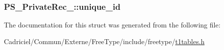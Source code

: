 \hypertarget{struct_p_s___private_rec___ae862c1db170cfee85aa3242be9fa5d57}{
\subsubsection[{unique\-\_\-id}]{ P\-S\-\_\-\-Private\-Rec\-\_\-\-::unique\-\_\-id}}\label{struct_p_s___private_rec___ae862c1db170cfee85aa3242be9fa5d57}


The documentation for this struct was generated from the following file\-:\begin{DoxyCompactItemize}
\item 
Cadriciel/\-Commun/\-Externe/\-Free\-Type/include/freetype/\hyperlink{t1tables_8h}{t1tables.\-h}\end{DoxyCompactItemize}
